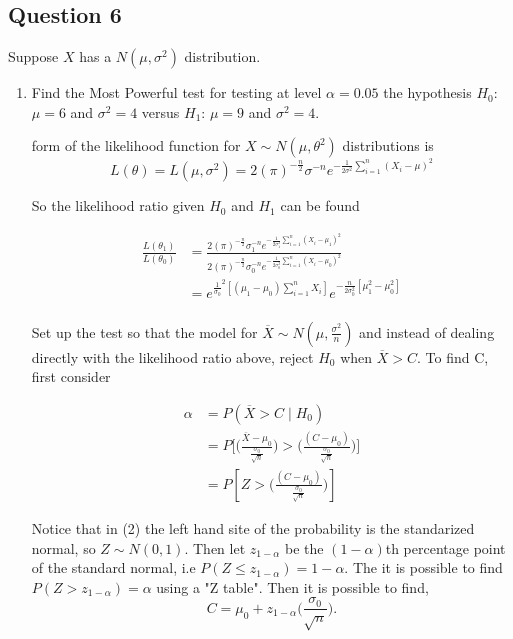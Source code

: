 \documentclass{tufte-book}
\theoremstyle{mytheoremstyle}
\theoremstyle{mylemstyle}
\theoremstyle{mydefstyle}
\begin{document}
\subsection{Question 6}
Suppose $X$ has a $N(\mu, \sigma^2)$ distribution.
\begin{enumerate}
\item Find the Most Powerful test for testing at level $\alpha=0.05$ the hypothesis $H_0$:$\mu = 6$ and $\sigma^2=4$ versus $H_1$: $\mu=9$ and $\sigma^2=4$.

 form of the likelihood function for $X \sim N(\mu, \theta^2)$ distributions is
\[ L(\theta) = L(\mu, \sigma^2) = 2(\pi)^{-\frac{n}{2}} \sigma^{-n} e^{-\frac{1}{2\sigma^2}\sum_{i=1}^n(X_i-\mu)^2} \]

So the likelihood ratio given $H_0$ and $H_1$ can be found 

\begin{align*}
\frac{ L(\theta_1)}{L(\theta_0)} &= \frac{2(\pi)^{-\frac{n}{2}} \sigma_1^{-n} e^{-\frac{1}{2\sigma_1^2}\sum_{i=1}^n(X_i-\mu_1)^2}}{2(\pi)^{-\frac{n}{2}} \sigma_0^{-n} e^{-\frac{1}{2\sigma_0^2}\sum_{i=1}^n(X_i-\mu_0)^2}}\\
&=e^{\frac{1}{\sigma_0}^2 [(\mu_1-\mu_0)\sum_{i=1}^nX_i]} e^{-\frac{n}{2\sigma_0^2}[\mu_1^2 -\mu_0^2]}\\
\end{align*}

Set up the test so that the model for $\overline{X} \sim N(\mu, \frac{\sigma^2}{n})$ and instead of dealing directly with the likelihood ratio above, reject $H_0$ when $\overline{X} > C$.  To find C, first consider

\begin{align}
\alpha &= P(\overline{X} > C \mid H_0)\\
&=P\Big[\Big(\frac{\overline{X} - \mu_0}{\frac{\sigma_0}{\sqrt{n}}}\Big) > \Big(\frac{(C- \mu_0)}{\frac{\sigma_0}{\sqrt{n}}}\Big) \Big]\\
&= P[Z > \Big(\frac{(C- \mu_0)}{\frac{\sigma_0}{\sqrt{n}}}\Big) ]
\end{align}

Notice that in (2) the left hand site of the probability is the standarized normal, so $Z \sim N(0,1)$.  Then let $z_{1-\alpha}$ be the $(1-\alpha)$th percentage point of the standard normal, i.e $P(Z \leq z_{1-\alpha}) = 1-\alpha$.  The it is possible to find $P(Z>z_{1-\alpha}) = \alpha$ using a "Z table".  Then it is possible to find,
\[C = \mu_0 + z_{1-\alpha}\Big(\frac{\sigma_0}{\sqrt{n}}\Big).\]


\end{enumerate}
\end{document}

